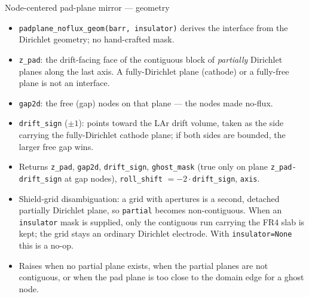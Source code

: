 \documentclass[10pt,aspectratio=169]{beamer}
\newcommand{\ti}[1]{\texttt{\footnotesize #1}}
\begin{document}
\begin{frame}[allowframebreaks]{Node-centered pad-plane mirror --- geometry}
  \begin{itemize}\small
  \item \ti{padplane\_noflux\_geom(barr, insulator)} derives the interface from the
        Dirichlet geometry; no hand-crafted mask.
  \item \ti{z\_pad}: the drift-facing face of the contiguous block of \emph{partially}
        Dirichlet planes along the last axis. A fully-Dirichlet plane (cathode) or a
        fully-free plane is not an interface.
  \item \ti{gap2d}: the free (gap) nodes on that plane --- the nodes made no-flux.
  \item \ti{drift\_sign} ($\pm1$): points toward the LAr drift volume, taken as the side
        carrying the fully-Dirichlet cathode plane; if both sides are bounded, the larger
        free gap wins.
  \item Returns \ti{z\_pad}, \ti{gap2d}, \ti{drift\_sign},
        \ti{ghost\_mask} (true only on plane \ti{z\_pad-drift\_sign} at gap nodes),
        \ti{roll\_shift} $=-2\cdot$\ti{drift\_sign}, \ti{axis}.
  \item Shield-grid disambiguation: a grid with apertures is a second, detached partially
        Dirichlet plane, so \ti{partial} becomes non-contiguous. When an \ti{insulator}
        mask is supplied, only the contiguous run carrying the FR4 slab is kept; the grid
        stays an ordinary Dirichlet electrode. With \ti{insulator=None} this is a no-op.
  \item Raises when no partial plane exists, when the partial planes are not contiguous, or
        when the pad plane is too close to the domain edge for a ghost node.
  \end{itemize}
\end{frame}
\end{document}
